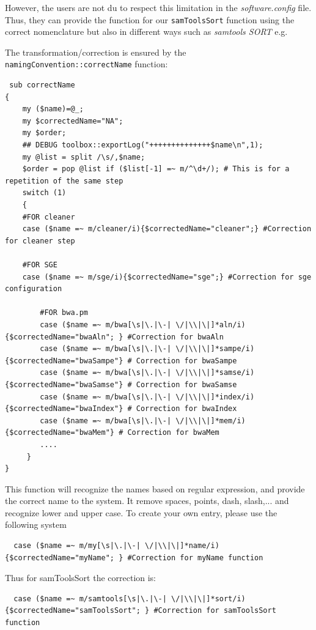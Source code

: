 \documentclass[a4paper,10pt]{report}
\begin{document}
However, the users are not du to respect this limitation in the \emph{software.config} file. Thus, they can provide the function for our \texttt{samToolsSort} function using the correct nomenclature but also in different ways such as \textit{samtools SORT} e.g.

The transformation/correction is ensured by the \texttt{namingConvention::correctName} function:

\begin{lstlisting}
 sub correctName
{
    my ($name)=@_;
    my $correctedName="NA";
    my $order;
    ## DEBUG toolbox::exportLog("++++++++++++++$name\n",1);
    my @list = split /\s/,$name;
    $order = pop @list if ($list[-1] =~ m/^\d+/); # This is for a repetition of the same step
    switch (1)
    {
	#FOR cleaner
	case ($name =~ m/cleaner/i){$correctedName="cleaner";} #Correction for cleaner step
	
	#FOR SGE
	case ($name =~ m/sge/i){$correctedName="sge";} #Correction for sge configuration
	
        #FOR bwa.pm
        case ($name =~ m/bwa[\s|\.|\-| \/|\\|\|]*aln/i){$correctedName="bwaAln"; } #Correction for bwaAln
        case ($name =~ m/bwa[\s|\.|\-| \/|\\|\|]*sampe/i){$correctedName="bwaSampe"} # Correction for bwaSampe
        case ($name =~ m/bwa[\s|\.|\-| \/|\\|\|]*samse/i){$correctedName="bwaSamse"} # Correction for bwaSamse
        case ($name =~ m/bwa[\s|\.|\-| \/|\\|\|]*index/i){$correctedName="bwaIndex"} # Correction for bwaIndex
        case ($name =~ m/bwa[\s|\.|\-| \/|\\|\|]*mem/i){$correctedName="bwaMem"} # Correction for bwaMem
        ....
     }
}
\end{lstlisting}

This function will recognize the names based on regular expression, and provide the correct name to the system. It remove spaces, points, dash, slash,... and recognize lower and upper case.
To create your own entry, please use the following system

\begin{lstlisting}
  case ($name =~ m/my[\s|\.|\-| \/|\\|\|]*name/i){$correctedName="myName"; } #Correction for myName function
\end{lstlisting}

Thus for samToolsSort the correction is:
\begin{lstlisting}
  case ($name =~ m/samtools[\s|\.|\-| \/|\\|\|]*sort/i){$correctedName="samToolsSort"; } #Correction for samToolsSort function
\end{lstlisting}
\end{document}
